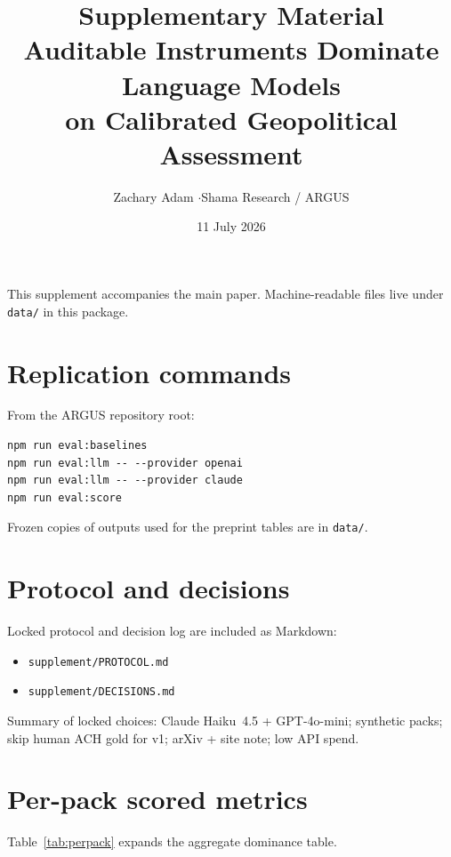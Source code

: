 \documentclass[11pt,a4paper]{article}
\title{\textbf{Supplementary Material}\\[0.4em]
\large Auditable Instruments Dominate Language Models\\
on Calibrated Geopolitical Assessment}
\author{Zachary Adam \quad$\cdot$\quad Shama Research / ARGUS}
\date{11 July 2026}
\begin{document}
\maketitle

\noindent This supplement accompanies the main paper.
Machine-readable files live under \texttt{data/} in this package.

\tableofcontents
\vspace{1em}

\section{Replication commands}
From the ARGUS repository root:

\begin{lstlisting}
npm run eval:baselines
npm run eval:llm -- --provider openai
npm run eval:llm -- --provider claude
npm run eval:score
\end{lstlisting}

Frozen copies of outputs used for the preprint tables are in \texttt{data/}.

\section{Protocol and decisions}
Locked protocol and decision log are included as Markdown:

\begin{itemize}
  \item \texttt{supplement/PROTOCOL.md}
  \item \texttt{supplement/DECISIONS.md}
\end{itemize}

Summary of locked choices: Claude Haiku~4.5 + GPT-4o-mini; synthetic packs; skip human ACH gold for v1; arXiv + site note; low API spend.

\section{Per-pack scored metrics}
Table~\ref{tab:perpack} expands the aggregate dominance table.
\end{document}
